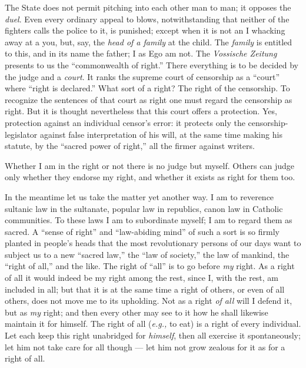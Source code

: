 The State does not permit pitching into each other man to man; it opposes the 
\textit{duel}. Even every ordinary appeal to blows, notwithstanding that 
neither of the fighters calls the police to it, is punished; except when it is 
not an I whacking away at a you, but, say, the \textit{head of a family} at 
the child. The \textit{family} is entitled to this, and in its name the 
father; I as Ego am not. The \textit{Vossische Zeitung} presents to us the 
``commonwealth of right.'' There everything is to be decided by the judge 
and a \textit{court}. It ranks the supreme court of censorship as a 
``court'' where ``right is declared.'' What sort of a right? The right of 
the censorship. To recognize the sentences of that court as right one must 
regard the censorship as right. But it is thought nevertheless that this court 
offers a protection. Yes, protection against an individual censor's error: it 
protects only the censorship-legislator against false interpretation of his 
will, at the same time making his statute, by the ``sacred power of right,'' 
all the firmer against writers.

Whether I am in the right or not there is no judge but myself. Others can 
judge only whether they endorse my right, and whether it exists as right for 
them too.

In the meantime let us take the matter yet another way. I am to reverence 
sultanic law in the sultanate, popular law in republics, canon law in Catholic 
communities. To these laws I am to subordinate myself; I am to regard them as 
sacred. A ``sense of right'' and ``law-abiding mind'' of such a sort is so 
firmly planted in people's heads that the most revolutionary persons of our 
days want to subject us to a new ``sacred law,'' the ``law of society,'' 
the law of mankind, the ``right of all,'' and the like. The right of 
``all'' is to go before \textit{my} right. As a right of all it would indeed 
be my right among the rest, since I, with the rest, am included in all; but 
that it is at the same time a right of others, or even of all others, does not 
move me to its upholding. Not as a right \textit{of all} will I defend it, but 
as \textit{my} right; and then every other may see to it how he shall likewise 
maintain it for himself. The right of all (\textit{e.g.,} to eat) is a right 
of every individual. Let each keep this right unabridged for \textit{himself}, 
then all exercise it spontaneously; let him not take care for all though --- let him not grow zealous for it as for a right of all.

